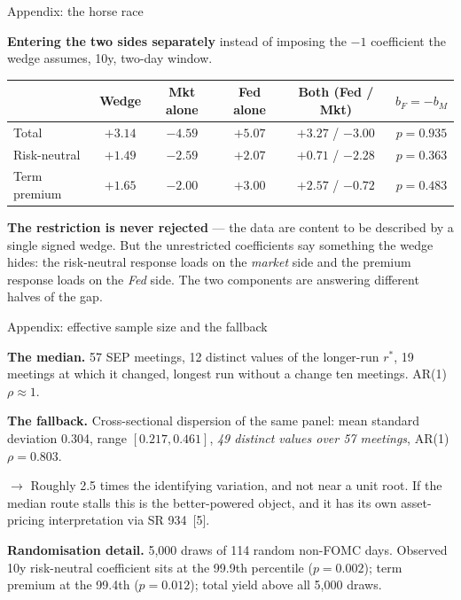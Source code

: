 \documentclass[aspectratio=169, 11pt]{beamer}
\newcommand{\rstar}{r^{*}}
\begin{document}
\appendix

\begin{frame}[noframenumbering]{Appendix: the horse race}

\textbf{Entering the two sides separately} instead of imposing the $-1$
coefficient the wedge assumes, 10y, two-day window.

\begin{center}
\small
\begin{tabular}{lccccc}
\toprule
 & Wedge & Mkt alone & Fed alone & Both (Fed / Mkt) & $b_F = -b_M$ \\
\midrule
Total        & $+3.14$ & $-4.59$ & $+5.07$ & $+3.27$ / $-3.00$ & $p = 0.935$ \\
Risk-neutral & $+1.49$ & $-2.59$ & $+2.07$ & $+0.71$ / $-2.28$ & $p = 0.363$ \\
Term premium & $+1.65$ & $-2.00$ & $+3.00$ & $+2.57$ / $-0.72$ & $p = 0.483$ \\
\bottomrule
\end{tabular}
\end{center}

\vspace{0.7em}

\textbf{The restriction is never rejected} --- the data are content to be
described by a single signed wedge. But the unrestricted coefficients say
something the wedge hides: the risk-neutral response loads on the
\emph{market} side and the premium response loads on the \emph{Fed} side.
The two components are answering different halves of the gap.

\end{frame}

\begin{frame}[noframenumbering]{Appendix: effective sample size and the fallback}

\textbf{The median.} 57 SEP meetings, 12 distinct values of the longer-run
$\rstar$, 19 meetings at which it changed, longest run without a change ten
meetings. AR(1) $\rho \approx 1$.

\vspace{0.7em}

\textbf{The fallback.} Cross-sectional dispersion of the same panel: mean
standard deviation 0.304, range $[0.217, 0.461]$, \emph{49 distinct values
over 57 meetings}, AR(1) $\rho = 0.803$.

\vspace{0.7em}

$\rightarrow$ Roughly 2.5 times the identifying variation, and not near a unit
root. If the median route stalls this is the better-powered object, and it
has its own asset-pricing interpretation via SR 934~[5].

\vspace{0.9em}

\textbf{Randomisation detail.} 5,000 draws of 114 random non-FOMC days.
Observed 10y risk-neutral coefficient sits at the 99.9th percentile
($p = 0.002$); term premium at the 99.4th ($p = 0.012$); total yield above
all 5,000 draws.

\end{frame}
\end{document}
